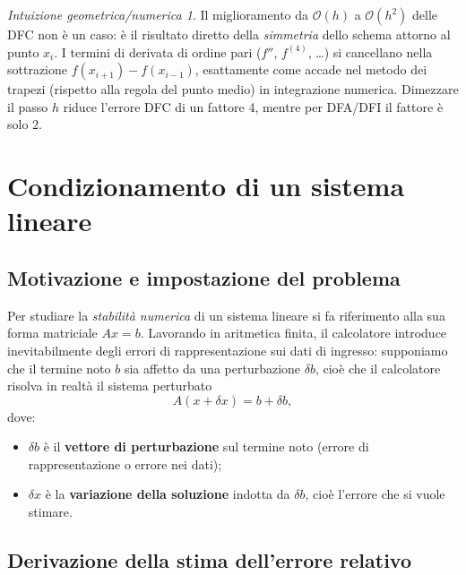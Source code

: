 \documentclass[a4paper,12pt]{article}
\theoremstyle{definition}
\theoremstyle{remark}
\newtheorem*{intuizione}{Intuizione geometrica/numerica}
\begin{document}
\begin{intuizione}
Il miglioramento da $\mathcal{O}(h)$ a $\mathcal{O}(h^2)$ delle DFC
non è un caso: è il risultato diretto della \emph{simmetria} dello schema
attorno al punto $x_i$.
I termini di derivata di ordine pari ($f''$, $f^{(4)}$, \ldots)
si cancellano nella sottrazione $f(x_{i+1}) - f(x_{i-1})$, esattamente
come accade nel metodo dei trapezi (rispetto alla regola del punto medio)
in integrazione numerica.
Dimezzare il passo $h$ riduce l'errore DFC di un fattore 4,
mentre per DFA/DFI il fattore è solo 2.
\end{intuizione}

\section{Condizionamento di un sistema lineare}

\subsection{Motivazione e impostazione del problema}

Per studiare la \emph{stabilità numerica} di un sistema lineare si fa
riferimento alla sua forma matriciale $Ax = b$.
Lavorando in aritmetica finita, il calcolatore introduce inevitabilmente
degli errori di rappresentazione sui dati di ingresso: supponiamo che
il termine noto $b$ sia affetto da una perturbazione $\delta b$, cioè che
il calcolatore risolva in realtà il sistema perturbato
\[
  A(x + \delta x) = b + \delta b,
\]
dove:
\begin{itemize}
  \item $\delta b$ è il \textbf{vettore di perturbazione} sul termine noto
        (errore di rappresentazione o errore nei dati);
  \item $\delta x$ è la \textbf{variazione della soluzione} indotta da $\delta b$,
        cioè l'errore che si vuole stimare.
\end{itemize}

\subsection{Derivazione della stima dell'errore relativo}
\end{document}
